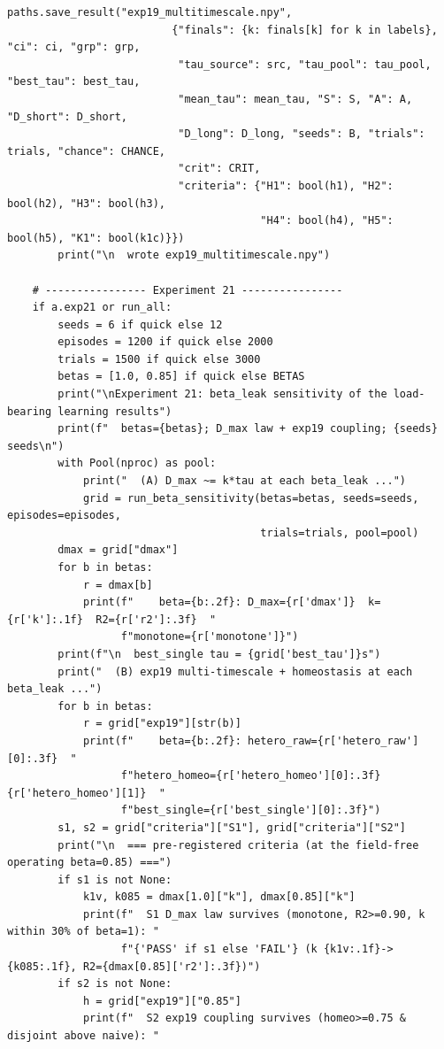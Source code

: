 \begin{lstlisting}[caption={mrl\_trace/extensions.py},label={lst:siox-src-extensions}]
        paths.save_result("exp19_multitimescale.npy",
                          {"finals": {k: finals[k] for k in labels}, "ci": ci, "grp": grp,
                           "tau_source": src, "tau_pool": tau_pool, "best_tau": best_tau,
                           "mean_tau": mean_tau, "S": S, "A": A, "D_short": D_short,
                           "D_long": D_long, "seeds": B, "trials": trials, "chance": CHANCE,
                           "crit": CRIT,
                           "criteria": {"H1": bool(h1), "H2": bool(h2), "H3": bool(h3),
                                        "H4": bool(h4), "H5": bool(h5), "K1": bool(k1c)}})
        print("\n  wrote exp19_multitimescale.npy")

    # ---------------- Experiment 21 ----------------
    if a.exp21 or run_all:
        seeds = 6 if quick else 12
        episodes = 1200 if quick else 2000
        trials = 1500 if quick else 3000
        betas = [1.0, 0.85] if quick else BETAS
        print("\nExperiment 21: beta_leak sensitivity of the load-bearing learning results")
        print(f"  betas={betas}; D_max law + exp19 coupling; {seeds} seeds\n")
        with Pool(nproc) as pool:
            print("  (A) D_max ~= k*tau at each beta_leak ...")
            grid = run_beta_sensitivity(betas=betas, seeds=seeds, episodes=episodes,
                                        trials=trials, pool=pool)
        dmax = grid["dmax"]
        for b in betas:
            r = dmax[b]
            print(f"    beta={b:.2f}: D_max={r['dmax']}  k={r['k']:.1f}  R2={r['r2']:.3f}  "
                  f"monotone={r['monotone']}")
        print(f"\n  best_single tau = {grid['best_tau']}s")
        print("  (B) exp19 multi-timescale + homeostasis at each beta_leak ...")
        for b in betas:
            r = grid["exp19"][str(b)]
            print(f"    beta={b:.2f}: hetero_raw={r['hetero_raw'][0]:.3f}  "
                  f"hetero_homeo={r['hetero_homeo'][0]:.3f} {r['hetero_homeo'][1]}  "
                  f"best_single={r['best_single'][0]:.3f}")
        s1, s2 = grid["criteria"]["S1"], grid["criteria"]["S2"]
        print("\n  === pre-registered criteria (at the field-free operating beta=0.85) ===")
        if s1 is not None:
            k1v, k085 = dmax[1.0]["k"], dmax[0.85]["k"]
            print(f"  S1 D_max law survives (monotone, R2>=0.90, k within 30% of beta=1): "
                  f"{'PASS' if s1 else 'FAIL'} (k {k1v:.1f}->{k085:.1f}, R2={dmax[0.85]['r2']:.3f})")
        if s2 is not None:
            h = grid["exp19"]["0.85"]
            print(f"  S2 exp19 coupling survives (homeo>=0.75 & disjoint above naive): "

\end{lstlisting}
